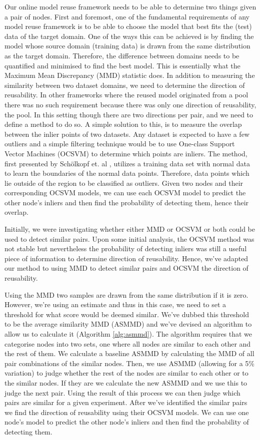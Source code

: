 \documentclass{mprop}
\begin{document}
Our online model reuse framework needs to be able to determine two things given a pair of nodes. First and foremost, one of the fundamental requirements of any model reuse framework is to be able to choose the model that best fits the (test) data of the target domain. One of the ways this can be achieved is by finding the model whose source domain (training data) is drawn from the same distribution as the target domain. Therefore, the difference between domains needs to be quantified and minimised to find the best model. This is essentially what the Maximum Mean Discrepancy (MMD) \cite{OriginalMMD} statistic does. In addition to measuring the similarity between two dataset domains, we need to determine the direction of reusability. In other frameworks where the reused model originated from a pool there was no such requirement because there was only one direction of reusability, the pool. In this setting though there are two directions per pair, and we need to define a method to do so. A simple solution to this, is to measure the overlap between the inlier points of two datasets. Any dataset is expected to have a few outliers and a simple filtering technique would be to use One-class Support Vector Machines (OCSVM) \cite{OriginalOCSVM} to determine which points are inliers.  The method, first presented by Schölkopf et. al \cite{OriginalOCSVM},  utilizes a training data set with normal data to learn the boundaries of the normal data points. Therefore, data points which lie outside of the region to be classified as outliers. Given two nodes and their corresponding OCSVM models, we can use each OCSVM model to predict the other node's inliers and then find the probability of detecting them, hence their overlap. 

Initially, we were investigating whether either MMD or OCSVM or both could be used to detect similar pairs.  Upon some initial analysis, the OCSVM method was not stable but nevertheless the probability of detecting inliers was still a useful piece of information to determine direction of reusability. Hence, we've adapted our method to using MMD to detect similar pairs and OCSVM the direction of reusability. 

Using the MMD two samples are drawn from the same distribution if it is zero. However, we're using an estimate and thus in this case, we need to set a threshold for what score would be deemed similar. We've dubbed this threshold to be the average similarity MMD (ASMMD) and we've devised an algorithm to allow us to calculate it (Algorithm \ref{alg:asmmd}). The algorithm requires that we categorise nodes into two sets, one where all nodes are similar to each other and the rest of them. We calculate a baseline ASMMD by calculating the MMD of all pair combinations of the similar nodes. Then, we use ASMMD (allowing for a 5\% variation) to judge whether the rest of the nodes are similar to each other or to the similar nodes. If they are we calculate the new ASMMD and we use this to judge the next pair. Using the result of this process we can then judge which pairs are similar for a given experiment. After we've identified the similar pairs we find the direction of reusability using their OCSVM models. We can use one node's model to predict the other node's inliers and then find the probability of detecting them. 
\end{document}
